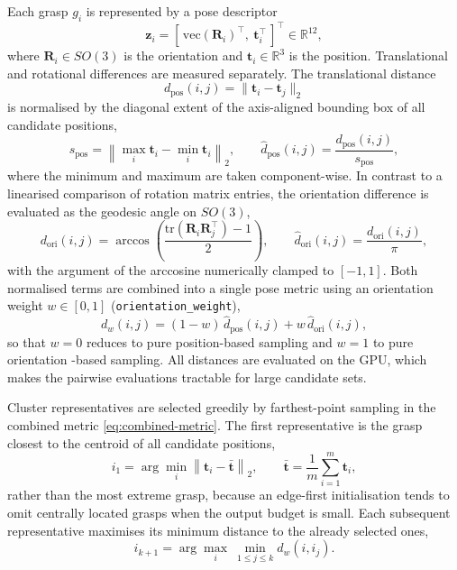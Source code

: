 \begin{enumerate}
Each grasp $g_i$ is represented by a pose descriptor
\begin{equation}
    \mathbf{z}_i =
    [\,\mathrm{vec}(\mathbf{R}_i)^\top,\ \mathbf{t}_i^\top\,]^\top
    \in \mathbb{R}^{12},
\end{equation}
where $\mathbf{R}_i \in SO(3)$ is the orientation and $\mathbf{t}_i \in \mathbb{R}^3$
is the position. Translational and rotational differences are measured separately. The
translational distance
\begin{equation}
    d_{\mathrm{pos}}(i,j) = \|\mathbf{t}_i - \mathbf{t}_j\|_2
\end{equation}
is normalised by the diagonal extent of the axis-aligned bounding box of all candidate
positions,
\begin{equation}
    s_{\mathrm{pos}} =
    \left\lVert
        \max_i \mathbf{t}_i - \min_i \mathbf{t}_i
    \right\rVert_2 ,
    \qquad
    \hat{d}_{\mathrm{pos}}(i,j) = \frac{d_{\mathrm{pos}}(i,j)}{s_{\mathrm{pos}}},
\end{equation}
where the minimum and maximum are taken component-wise. In contrast to a linearised
comparison of rotation matrix entries, the orientation difference is evaluated as the
geodesic angle on $SO(3)$,
\begin{equation}
    d_{\mathrm{ori}}(i,j) =
    \arccos\!\left(
        \frac{\mathrm{tr}\!\left(\mathbf{R}_i \mathbf{R}_j^\top\right) - 1}{2}
    \right),
    \qquad
    \hat{d}_{\mathrm{ori}}(i,j) = \frac{d_{\mathrm{ori}}(i,j)}{\pi},
\end{equation}
with the argument of the arccosine numerically clamped to $[-1,1]$. Both normalised
terms are combined into a single pose metric using an orientation weight
$w \in [0,1]$ (\texttt{orientation\_weight}),
\begin{equation}
    \label{eq:combined-metric}
    d_w(i,j) =
    (1 - w)\,\hat{d}_{\mathrm{pos}}(i,j) + w\,\hat{d}_{\mathrm{ori}}(i,j),
\end{equation}
so that $w = 0$ reduces to pure position-based sampling and $w = 1$ to pure orientation
-based sampling. All distances are evaluated on the GPU, which makes the pairwise
evaluations tractable for large candidate sets.

Cluster representatives are selected greedily by farthest-point sampling in the combined
metric \eqref{eq:combined-metric}. The first representative is the grasp closest to the
centroid of all candidate positions,
\begin{equation}
    i_1 = \arg\min_i \left\lVert \mathbf{t}_i - \bar{\mathbf{t}} \right\rVert_2 ,
    \qquad
    \bar{\mathbf{t}} = \frac{1}{m} \sum_{i=1}^{m} \mathbf{t}_i ,
\end{equation}
rather than the most extreme grasp, because an edge-first initialisation tends to omit
centrally located grasps when the output budget is small. Each subsequent representative
maximises its minimum distance to the already selected ones,
\begin{equation}
    i_{k+1} = \arg\max_{i}\ \min_{1 \le j \le k} d_w(i, i_j).
\end{equation}


\end{enumerate}
